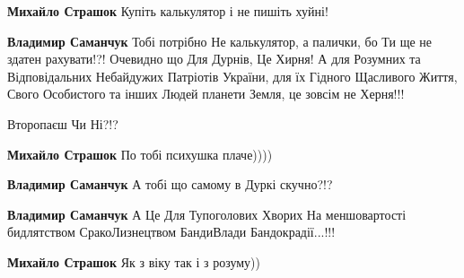 \begin{itemize}
\begin{itemize}
\textbf{Михайло Страшок} Купіть калькулятор і не пишіть хуйні!

 
\textbf{Владимир Саманчук} Тобі потрібно Не калькулятор, а палички, бо Ти ще не
здатен рахувати!?! Очевидно що Для Дурнів, Це Хирня! А для Розумних та
Відповідальних Небайдужих Патріотів України, для їх Гідного Щасливого Життя,
Свого Особистого та інших Людей планети Земля, це зовсім не Херня!!!

Второпаєш Чи Ні?!?

 
\textbf{Михайло Страшок} По тобі психушка плаче))))

 
\textbf{Владимир Саманчук} А тобі що самому в Дуркі скучно?!?

 
\textbf{Владимир Саманчук} А Це Для Тупоголових Хворих На меншовартості бидлятством СракоЛизнецтвом БандиВлади Бандокрадії...!!!

 
\textbf{Михайло Страшок} Як з віку так і з розуму))

 

\end{itemize}
\end{itemize}
